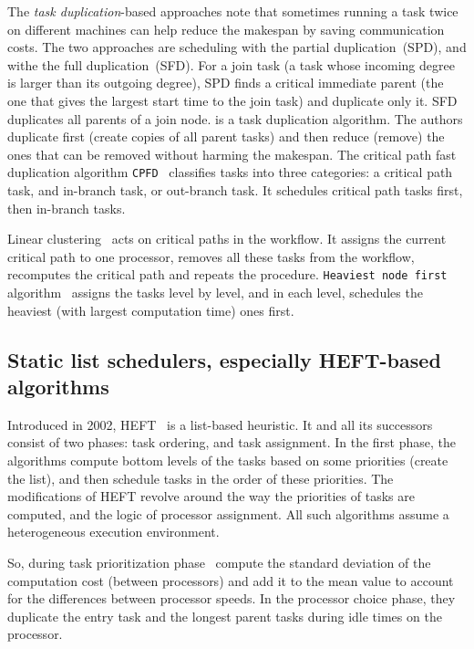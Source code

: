 \documentclass[conference]{IEEEtran}
\begin{document}
    The \textit{task duplication}-based approaches note that sometimes running a task twice on different machines can
    help reduce the makespan by saving communication costs.
    The two approaches are scheduling with the partial duplication~(SPD), and withe the full duplication~(SFD).
    For a join task (a task whose incoming degree is larger than its outgoing degree), SPD finds a critical immediate
    parent (the one that gives the largest start time to the join task) and duplicate only it.
    SFD duplicates all parents of a join node.
    \cite{dfrn1997} is a task duplication algorithm.
    The authors duplicate first (create copies of all parent tasks) and then reduce (remove) the ones that can be removed without harming
    the makespan.
    The critical path fast duplication algorithm \texttt{CPFD}~\cite{5727760} classifies tasks into three categories: a critical
    path task, and in-branch task, or out-branch task.
    It schedules critical path tasks first, then in-branch tasks.

    Linear clustering~\cite{KWOK1999381} acts on critical paths in the workflow.
    It assigns the current critical path to one processor, removes all these tasks from the workflow, recomputes the critical
    path and repeats the procedure.
    \texttt{Heaviest node first} algorithm~\cite{SHIRAZI1990222} assigns the tasks level by level, and in each level,
    schedules the heaviest (with largest computation time)  ones first.


    \subsection{Static list schedulers, especially HEFT-based algorithms}

    Introduced in 2002, HEFT~\cite{topcuoglu2002performance} is a list-based heuristic.
    It and all its successors consist of two phases: task ordering, and task assignment.
    In the first phase, the algorithms compute bottom levels of the tasks based on some priorities (create the list),
    and then schedule tasks in the order of these priorities.
    The modifications of HEFT revolve around the way the priorities of tasks are computed, and the logic
    of processor assignment.
    All such algorithms assume a heterogeneous execution environment.

    So, during task prioritization phase~\cite{sulaiman2021hybrid} compute the standard deviation of the computation cost
    (between processors) and add it to the mean value to account for the differences between processor speeds.
    In the processor choice phase, they duplicate the entry task and the longest parent tasks during idle times on the processor.
\end{document}
